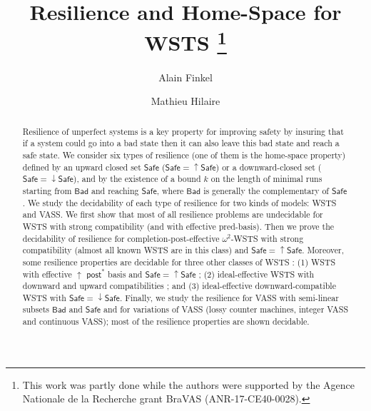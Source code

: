 \documentclass[runningheads]{llncs}
\newcommand{\post}{\textsf{post}}
\newcommand{\Bad}{\textsf{Bad}}
\newcommand{\Safe}{\textsf{Safe}}
\begin{document}
%
\title{Resilience and Home-Space for WSTS \thanks{This work was partly done while the authors were supported by the Agence Nationale de la Recherche grant BraVAS (ANR-17-CE40-0028).}} 
%
%
\author{Alain Finkel \and Mathieu Hilaire}
%
%

%
\maketitle              %
%





\begin{abstract}
\noindent
Resilience of unperfect systems is a key property for improving safety by insuring that if a system could go into a bad state then it can also leave this bad state and reach a safe state.
We consider six types of resilience (one of them is the home-space property) defined by an upward closed set $\Safe$  ($\Safe=\uparrow \Safe$) or a downward-closed set ($\Safe=\downarrow \Safe$), and by the existence of a bound $k$ on the length of minimal runs starting from $\Bad$ and reaching $\Safe$, where $\Bad$ is generally the complementary of $\Safe$. We study the decidability of each type of resilience for two kinds of models: WSTS and VASS. We first show that most of all resilience problems are undecidable for WSTS with strong compatibility (and with effective pred-basis). Then we prove the decidability of resilience for completion-post-effective $\omega^2$-WSTS with strong compatibility (almost all known WSTS are in this class) and $\Safe = \uparrow \Safe$. Moreover, some resilience properties are decidable for three other classes of WSTS : (1) WSTS with effective 
$\uparrow$ $\post^*$ basis and $\Safe=\uparrow \Safe$ ; (2) ideal-effective WSTS with downward and upward compatibilities ; and (3) ideal-effective downward-compatible WSTS with $\Safe=\downarrow \Safe$. Finally, we study the resilience for VASS with semi-linear subsets $\Bad$ and $\Safe$ and for variations of VASS (lossy counter machines, integer VASS and continuous VASS); most of the resilience properties are shown decidable.
\end{abstract}
\end{document}
